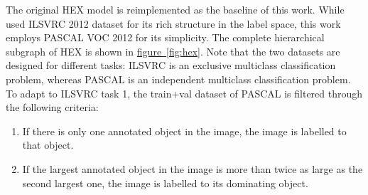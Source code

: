 \documentclass[11pt,a4paper]{article}
\begin{document}
The original HEX model is reimplemented as the baseline of this work. While \cite{deng2014large} used ILSVRC 2012 dataset for its rich structure in the label space, this work employs PASCAL VOC 2012 \cite{pascal-voc-2012} for its simplicity. The complete hierarchical subgraph of HEX is shown in \hyperref[fig:hex]{figure~\ref{fig:hex}}. Note that the two datasets are designed for different tasks: ILSVRC is an exclusive multiclass classification problem, whereas PASCAL is an independent multiclass classification problem. To adapt to ILSVRC task 1, the train+val dataset of PASCAL is filtered through the following criteria:
\begin{enumerate}
\item If there is only one annotated object in the image, the image is labelled to that object.
\item If the largest annotated object in the image is more than twice as large as the second largest one, the image is labelled to its dominating object.
\end{enumerate}
\end{document}
